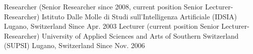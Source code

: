 \begin{cventries}
\cventry
{Researcher (Senior Researcher since 2008, current position Senior Lecturer-Researcher)}
{Istituto Dalle Molle di Studi sull'Intelligenza Artificiale (IDSIA)}
{Lugano, Switzerland}
{Since Apr. 2003}
{}
\cventry
{Lecturer (current position Senior Lecturer-Researcher)}
{University of Applied Sciences and Arts of Southern Switzerland (SUPSI)}
{Lugano, Switzerland}
{Since Nov. 2006}
{}
\end{cventries}
